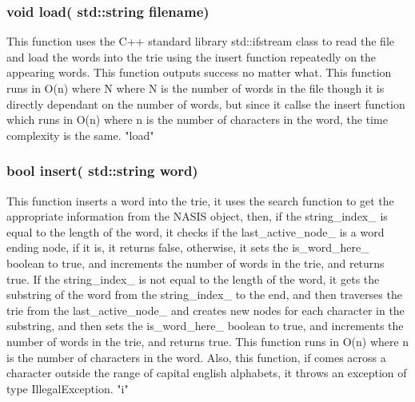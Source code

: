 \subsubsection{{\color{orange}void} {\color{draculapurple}load}({\color{orange} std::string} filename)}
This function uses the C++ standard library {\color{orange}std::ifstream} class to read the file and load the words into the trie using the {\color{draculapurple}insert} function repeatedly on the appearing words.
This function outputs {\color{green}success} no matter what. This function runs in {\color{lightblue}O(n)} where {\color{lightblue}N} where N is the number of words in the file 
though it is directly dependant on the number of words, but since it callse the {\color{draculapurple}insert} function which runs in {\color{lightblue}O(n)} where {\color{lightblue}n} 
is the number of characters in the word, the time complexity is the same.
{\color{GoldenYellow} "load"}

\subsubsection{{\color{orange}bool} {\color{draculapurple}insert}({\color{orange} std::string} word)}
This function inserts a word into the trie, it uses the {\color{draculapurple}search} function to get the appropriate information from the NASIS object, 
then, if the {\color{draculapurple}string\_index\_} is equal to the length of the word, it checks if the {\color{draculapurple}last\_active\_node\_} 
is a word ending node, if it is, it returns false, otherwise, it sets the {\color{draculapurple}is\_word\_here\_} boolean to true, and increments the 
number of words in the trie, and returns true. If the {\color{draculapurple}string\_index\_} is not equal to the length of the word, it gets the substring
 of the word from the {\color{draculapurple}string\_index\_} to the end, and then traverses the trie from the {\color{draculapurple}last\_active\_node\_} 
 and creates new nodes for each character in the substring, and then sets the {\color{draculapurple}is\_word\_here\_} boolean to true, and increments the
  number of words in the trie, and returns true. This function runs in {\color{lightblue}O(n)} where {\color{lightblue}n} is the number of characters in the word.
  Also, this function, if comes across a character outside the range of capital english alphabets, it throws an exception of type {\color{orange}IllegalException}.
  {\color{GoldenYellow} "i"}


